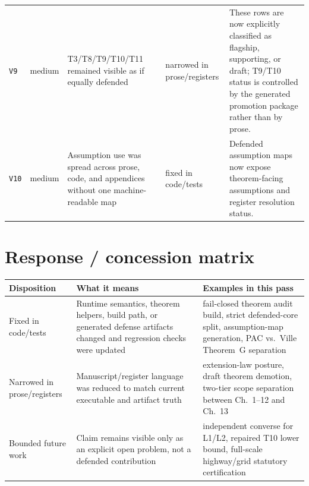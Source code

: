\documentclass[11pt,oneside]{report}
\begin{document}
\begin{longtable}{p{}p{}p{}p{}p{}}
\texttt{V9} & medium & T3/T8/T9/T10/T11 remained visible as if equally defended & narrowed in prose/registers & These rows are now explicitly classified as flagship, supporting, or draft; T9/T10 status is controlled by the generated promotion package rather than by prose.\\
\texttt{V10} & medium & Assumption use was spread across prose, code, and appendices without one machine-readable map & fixed in code/tests & Defended assumption maps now expose theorem-facing assumptions and register resolution status.\\
\bottomrule
\end{longtable}

\section*{Response / concession matrix}
\begin{tabular}{@{}p{}p{}p{}@{}}
\toprule
\textbf{Disposition} & \textbf{What it means} & \textbf{Examples in this pass}\\
\midrule
Fixed in code/tests & Runtime semantics, theorem helpers, build path, or generated defense artifacts changed and regression checks were updated & fail-closed theorem audit build, strict defended-core split, assumption-map generation, PAC vs.\ Ville Theorem~G separation\\
Narrowed in prose/registers & Manuscript/register language was reduced to match current executable and artifact truth & extension-law posture, draft theorem demotion, two-tier scope separation between Ch.~1--12 and Ch.~13\\
Bounded future work & Claim remains visible only as an explicit open problem, not a defended contribution & independent converse for L1/L2, repaired T10 lower bound, full-scale highway/grid statutory certification\\
\bottomrule
\end{tabular}
\end{document}
